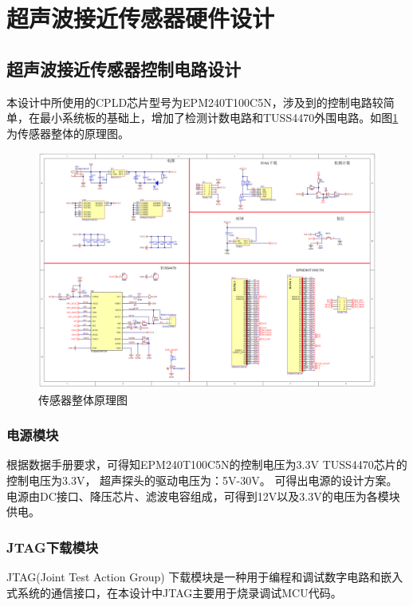 \newpage
\section{超声波接近传感器硬件设计}

\subsection{超声波接近传感器控制电路设计}
本设计中所使用的CPLD芯片型号为EPM240T100C5N，涉及到的控制电路较简单，在最小系统板的基础上，增加了检测计数电路和TUSS4470外围电路。如图\ref{传感器整体原理图}为传感器整体的原理图。
\begin{figure}[ht]
	\centering
	\includegraphics[width=12cm]{figure/Overall circuit.png}
	\caption{传感器整体原理图}
	\label{传感器整体原理图}
\end{figure}
\subsubsection{电源模块}
根据数据手册要求，可得知EPM240T100C5N的控制电压为3.3V
TUSS4470芯片的控制电压为3.3V，
超声探头的驱动电压为：5V-30V。
可得出电源的设计方案。电源由DC接口、降压芯片、滤波电容组成，可得到12V以及3.3V的电压为各模块供电。

\subsubsection{JTAG下载模块}
JTAG(Joint Test Action Group) 下载模块是一种用于编程和调试数字电路和嵌入式系统的通信接口，在本设计中JTAG主要用于烧录调试MCU代码。

